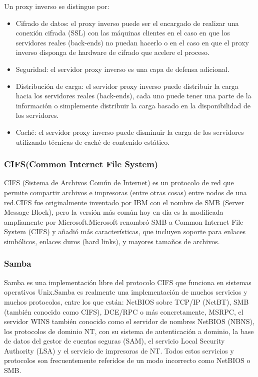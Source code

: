 Un proxy inverso se distingue por:

\begin{itemize}

	\item Cifrado de datos: el proxy inverso puede ser el encargado de realizar una conexión cifrada (SSL) con las máquinas clientes en el caso en que los servidores reales (back-ends) no puedan hacerlo o en el caso en que el proxy inverso disponga de hardware de cifrado que acelere el proceso.
	
	\item Seguridad: el servidor proxy inverso es una capa de defensa adicional.
	
	\item Distribución de carga: el servidor proxy inverso puede distribuir la carga hacia los servidores reales (back-ends), cada uno puede tener una parte de la información o simplemente distribuir la carga basado en la disponibilidad de los servidores.
	
	\item Caché: el servidor proxy inverso puede disminuir la carga de los servidores utilizando técnicas de caché de contenido estático.

\end{itemize}


\subsubsection*{CIFS(Common Internet File System)}

CIFS (Sistema de Archivos Común de Internet) es un protocolo de red que permite compartir archivos e impresoras (entre otras cosas) entre nodos de una red.\newline CIFS fue originalmente inventado por IBM con el nombre de SMB (Server Message Block), pero la versión más común hoy en día es la modificada ampliamente por Microsoft.\newline  Microsoft renombró SMB a Common Internet File System (CIFS) y añadió más características, que incluyen soporte para enlaces simbólicos, enlaces duros (hard links), y mayores tamaños de archivos.


\subsubsection*{Samba \cite{samba} }

Samba es una implementación libre del protocolo CIFS que funciona en sistemas operativos Unix.\newline Samba es realmente una implementación de muchos servicios y muchos protocolos, entre los que están: NetBIOS sobre TCP/IP (NetBT), SMB (también conocido como CIFS), DCE/RPC o más concretamente, MSRPC, el servidor WINS también conocido como el servidor de nombres NetBIOS (NBNS), los protocolos de dominio NT, con su sistema de autenticación a dominio, la base de datos del gestor de cuentas seguras (SAM), el servicio Local Security Authority (LSA) y el servicio de impresoras de NT. Todos estos servicios y protocolos son frecuentemente referidos de un modo incorrecto como NetBIOS o SMB.


